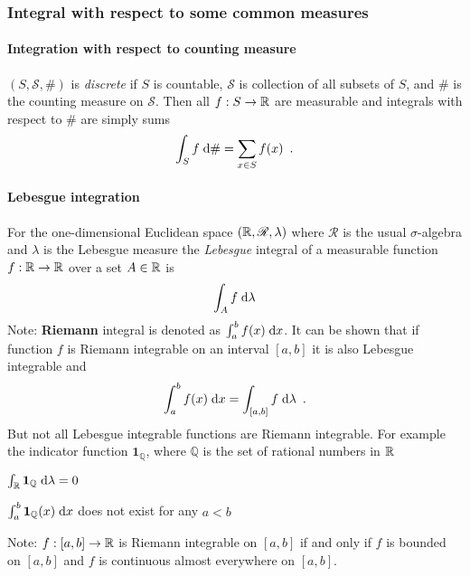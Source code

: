 \subsubsection{Integral with respect to some common measures}

\paragraph{Integration with respect to counting measure} $(S, \mathscr{S}, \#)$ is \emph{discrete} if $S$ is countable, $\mathscr{S}$ is collection of all subsets of $S$, and $\#$ is the counting measure on $\mathscr{S}$.
Then all $f : S \to \mathbb{R}$ are measurable and integrals with respect to $\#$ are simply sums
\begin{equation}
\int_S f \; \text{d} \# = \sum_{x \in S} f(x) \enspace .
\end{equation}

\paragraph{Lebesgue integration} For the one-dimensional Euclidean space $(\mathbb{R}, \mathscr{R}, \lambda)$ where $\mathscr{R}$ is the usual $\sigma$-algebra and $\lambda$ is the Lebesgue measure the \emph{Lebesgue} integral of a measurable function $f : \mathbb{R} \to \mathbb{R}$ over a set $A \in \mathbb{R}$ is
\begin{equation}
\int_A f \; \text{d} \lambda
\end{equation}
Note: \textbf{Riemann} integral is denoted as $\int_a^b f(x) \; \text{d} x$. It can be shown that if function $f$ is Riemann integrable on an interval $[a, b]$ it is also Lebesgue integrable and 
\begin{equation}
\int_a^b f(x) \; \text{d} x = \int_{[a,b]} f \; \text{d} \lambda \enspace .
\end{equation}
But not all Lebesgue integrable functions are Riemann integrable.
For example the indicator function $\mathbf{1}_\mathbb{Q}$, where $\mathbb{Q}$ is the set of rational numbers in $\mathbb{R}$
\begin{compactitem}
\item $\int_{\mathbb{R}} \mathbf{1}_\mathbb{Q} \; \text{d} \lambda = 0$
\item $\int_a^b \mathbf{1}_\mathbb{Q}(x) \; \text{d} x$ does not exist for any $a < b$
\end{compactitem}

Note: $f : [a, b] \to \mathbb{R}$ is Riemann integrable on $[a,b]$ if and only if $f$ is bounded on $[a, b]$ and $f$ is continuous almost everywhere on $[a, b]$.


